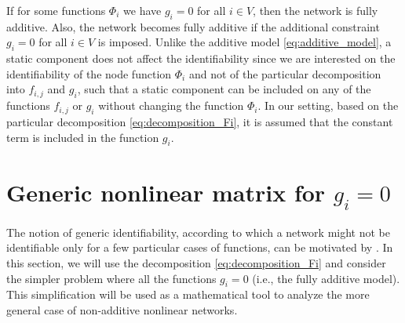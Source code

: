 \documentclass[letterpaper,10pt,journal]{IEEEtran}
\begin{document}
If for some functions $\Phi_i$ we have $g_i=0$ for all $i\in V$, then the network is fully additive. Also, the network becomes fully additive if the additional constraint $g_i=0$ for all $i\in V$ is imposed.
Unlike the additive model \eqref{eq:additive_model}, a static component does not affect the identifiability since we are interested on the identifiability of the node function $\Phi_i$ and not of the particular decomposition into $f_{i,j}$ and $g_i$, such that a static component can be included on any of the functions $f_{i,j}$ or $g_i$ without changing the function $\Phi_i$.  
In our setting, based on the particular decomposition \eqref{eq:decomposition_Fi}, it is assumed that the constant term is included in the function $g_i$.















\section{Generic nonlinear matrix for $g_i=0$}\label{sec:generic}


The notion of generic identifiability, according to which a network might not be identifiable only for a few particular cases of functions, can be motivated by \cite[Example~1]{vizuete2024partial}. In this section, we will use the decomposition \eqref{eq:decomposition_Fi} and consider the simpler problem where all the functions $g_i=0$ (i.e., the fully additive model). This simplification will be used as a mathematical tool to analyze the more general case of non-additive nonlinear networks. 
\end{document}
